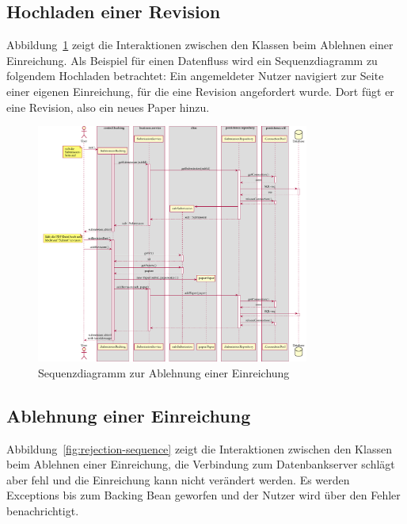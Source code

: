 
\subsection{Hochladen einer Revision}\label{subsec:sequenz-revision-hochladen}

Abbildung~\ref{fig:upload-revision-sequence} zeigt die Interaktionen zwischen den Klassen beim Ablehnen einer Einreichung.
Als Beispiel für einen Datenfluss wird ein Sequenzdiagramm zu folgendem Hochladen betrachtet:
Ein angemeldeter Nutzer navigiert zur Seite einer eigenen Einreichung, für die eine Revision angefordert wurde.
Dort fügt er eine Revision, also ein neues Paper hinzu.

\begin{figure}[H]
    \centering
    \includegraphics[width=0.8\textwidth]{graphics/upload_revision}
    \caption{Sequenzdiagramm zur Ablehnung einer Einreichung}
    \label{fig:upload-revision-sequence}
\end{figure}

\subsection{Ablehnung einer Einreichung}\label{subsec:sequenz-ablehnung}

Abbildung~\ref{fig:rejection-sequence} zeigt die Interaktionen zwischen den Klassen beim Ablehnen einer Einreichung, die Verbindung zum Datenbankserver schlägt aber fehl und die Einreichung kann nicht verändert werden. Es werden Exceptions bis zum Backing Bean geworfen und der Nutzer wird über den Fehler benachrichtigt.

